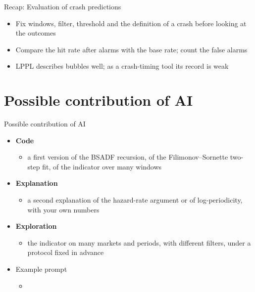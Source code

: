 \begin{frame}{Recap: Evaluation of crash predictions}
\itemsize{\small}
\begin{itemize}
    \item Fix windows, filter, threshold and the definition of a crash before looking at the outcomes
    \item Compare the hit rate after alarms with the base rate; count the false alarms
    \item LPPL describes bubbles well; as a crash-timing tool its record is weak
\end{itemize}
\end{frame}


\section{Possible contribution of AI}

\begin{frame}{Possible contribution of AI}
\itemsize{\small}
\begin{itemize}
    \item \textbf{Code}
    \begin{itemize}
        \item a first version of the BSADF recursion, of the Filimonov--Sornette two-step fit, of the indicator over many windows
    \end{itemize}
    \item \textbf{Explanation}
    \begin{itemize}
        \item a second explanation of the hazard-rate argument or of log-periodicity, with your own numbers
    \end{itemize}
    \item \textbf{Exploration}
    \begin{itemize}
        \item the indicator on many markets and periods, with different filters, under a protocol fixed in advance
    \end{itemize}
    \item Example prompt
    \begin{itemize}
        \item {}
    \end{itemize}
\end{itemize}
\end{frame}

